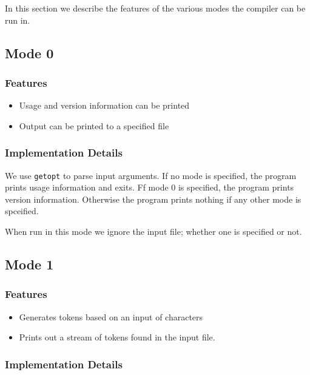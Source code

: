 \documentclass{article}
\begin{document}
In this section we describe the features of the various modes the compiler can be run in.

\subsection{Mode 0}

\subsubsection{Features}

\begin{itemize}
    \item Usage and version information can be printed
    \item Output can be printed to a specified file
\end{itemize}

\subsubsection{Implementation Details}

We use \verb|getopt| to parse input arguments. If no mode is specified, the program prints usage information and exits. Ff mode 0 is specified, the program prints version information. Otherwise the program prints nothing if any other mode is spceified. 

When run in this mode we ignore the input file; whether one is specified or not.

\subsection{Mode 1}

\subsubsection{Features}

\begin{itemize}
    \item Generates tokens based on an input of characters
    \item Prints out a stream of tokens found in the input file.
\end{itemize}

\subsubsection{Implementation Details}
\end{document}
